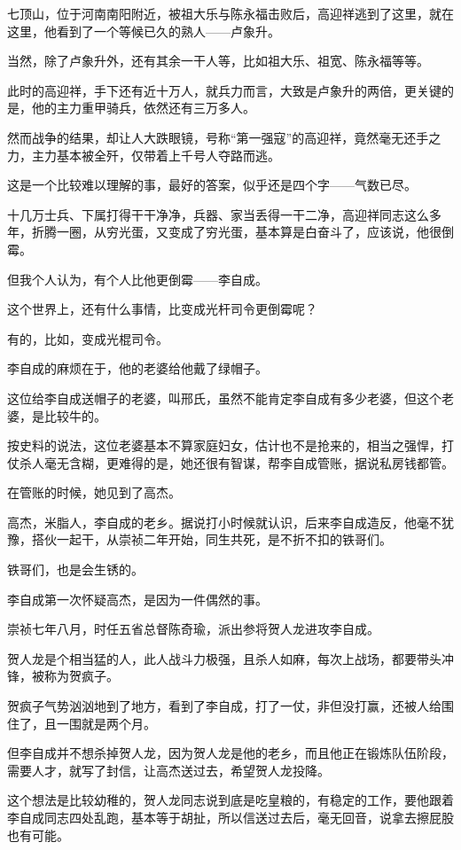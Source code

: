 \begin{multicols}{\theparacolNo}
七顶山，位于河南南阳附近，被祖大乐与陈永福击败后，高迎祥逃到了这里，就在这里，他看到了一个等候已久的熟人——卢象升。

当然，除了卢象升外，还有其余一干人等，比如祖大乐、祖宽、陈永福等等。

此时的高迎祥，手下还有近十万人，就兵力而言，大致是卢象升的两倍，更关键的是，他的主力重甲骑兵，依然还有三万多人。

然而战争的结果，却让人大跌眼镜，号称“第一强寇”的高迎祥，竟然毫无还手之力，主力基本被全歼，仅带着上千号人夺路而逃。

这是一个比较难以理解的事，最好的答案，似乎还是四个字——气数已尽。

十几万士兵、下属打得干干净净，兵器、家当丢得一干二净，高迎祥同志这么多年，折腾一圈，从穷光蛋，又变成了穷光蛋，基本算是白奋斗了，应该说，他很倒霉。

但我个人认为，有个人比他更倒霉——李自成。

这个世界上，还有什么事情，比变成光杆司令更倒霉呢？

有的，比如，变成光棍司令。

李自成的麻烦在于，他的老婆给他戴了绿帽子。

这位给李自成送帽子的老婆，叫邢氏，虽然不能肯定李自成有多少老婆，但这个老婆，是比较牛的。

按史料的说法，这位老婆基本不算家庭妇女，估计也不是抢来的，相当之强悍，打仗杀人毫无含糊，更难得的是，她还很有智谋，帮李自成管账，据说私房钱都管。

在管账的时候，她见到了高杰。

高杰，米脂人，李自成的老乡。据说打小时候就认识，后来李自成造反，他毫不犹豫，搭伙一起干，从崇祯二年开始，同生共死，是不折不扣的铁哥们。

铁哥们，也是会生锈的。

李自成第一次怀疑高杰，是因为一件偶然的事。

崇祯七年八月，时任五省总督陈奇瑜，派出参将贺人龙进攻李自成。

贺人龙是个相当猛的人，此人战斗力极强，且杀人如麻，每次上战场，都要带头冲锋，被称为贺疯子。

贺疯子气势汹汹地到了地方，看到了李自成，打了一仗，非但没打赢，还被人给围住了，且一围就是两个月。

但李自成并不想杀掉贺人龙，因为贺人龙是他的老乡，而且他正在锻炼队伍阶段，需要人才，就写了封信，让高杰送过去，希望贺人龙投降。

这个想法是比较幼稚的，贺人龙同志说到底是吃皇粮的，有稳定的工作，要他跟着李自成同志四处乱跑，基本等于胡扯，所以信送过去后，毫无回音，说拿去擦屁股也有可能。


\end{multicols}
